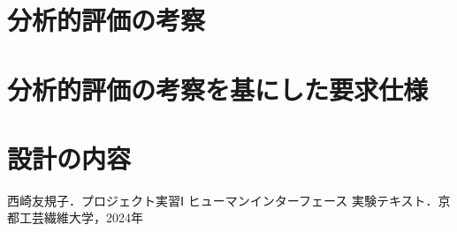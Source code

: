 \documentclass{jlreq}
\numberwithin{equation}{section}
\begin{document}
\section{分析的評価の考察}

\section{分析的評価の考察を基にした要求仕様}

\section{設計の内容}

\begin{thebibliography}{9}
  \item 西崎友規子．プロジェクト実習Ⅰ ヒューマンインターフェース 実験テキスト．京都工芸繊維大学，2024年
\end{thebibliography}
\end{document}
